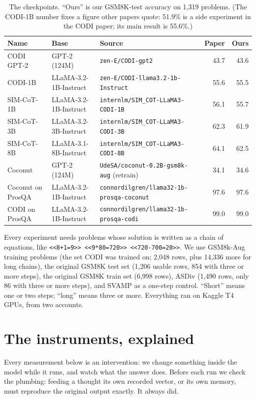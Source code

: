 \documentclass{article}
\begin{document}
\begin{table}[h]
\caption{The checkpoints. ``Ours'' is our GSM8K-test accuracy on 1,319 problems. (The CODI-1B number fixes a figure other papers quote: 51.9\% is a side experiment in the CODI paper; its main result is 55.6\%.)}
\label{tab:models}
\centering\scriptsize
\setlength{\tabcolsep}{4pt}
\begin{tabular}{lllrr}
\toprule
Name & Base & Source & Paper & Ours \\
\midrule
CODI GPT-2 & GPT-2 (124M) & \texttt{zen-E/CODI-gpt2} & 43.7 & 43.6 \\
CODI-1B & LLaMA-3.2-1B-Instruct & \texttt{zen-E/CODI-llama3.2-1b-Instruct} & 55.6 & 55.5 \\
SIM-CoT-1B & LLaMA-3.2-1B-Instruct & \texttt{internlm/SIM\_COT-LLaMA3-CODI-1B} & 56.1 & 55.7 \\
SIM-CoT-3B & LLaMA-3.2-3B-Instruct & \texttt{internlm/SIM\_COT-LLaMA3-CODI-3B} & 62.3 & 61.9 \\
SIM-CoT-8B & LLaMA-3.1-8B-Instruct & \texttt{internlm/SIM\_COT-LLaMA3-CODI-8B} & 64.1 & 62.5 \\
Coconut & GPT-2 (124M) & \texttt{UdeSA/coconut-0.2B-gsm8k-aug} (retrain) & 34.1 & 34.6 \\
Coconut on ProsQA & LLaMA-3.2-1B-Instruct & \texttt{connordilgren/llama32-1b-prosqa-coconut} & 97.6 & 97.6 \\
CODI on ProsQA & LLaMA-3.2-1B-Instruct & \texttt{connordilgren/llama32-1b-prosqa-codi} & 99.0 & 99.0 \\
\bottomrule
\end{tabular}
\end{table}

Every experiment needs problems whose solution is written as a chain of equations, like \texttt{<<8+1=9>> <<9*80=720>> <<720-700=20>>}. We use GSM8k-Aug training problems (the set CODI was trained on; 2,048 rows, plus 14,336 more for long chains), the original GSM8K test set (1,206 usable rows, 854 with three or more steps), the original GSM8K train set (6,998 rows), ASDiv (1,490 rows, only 86 with three or more steps), and SVAMP as a one-step control. ``Short'' means one or two steps; ``long'' means three or more. Everything ran on Kaggle T4 GPUs, from two accounts.

\section{The instruments, explained}

Every measurement below is an intervention: we change something inside the model while it runs, and watch what the answer does. Before each run we check the plumbing: feeding a thought its own recorded vector, or its own memory, must reproduce the original output exactly. It always did.
\end{document}
